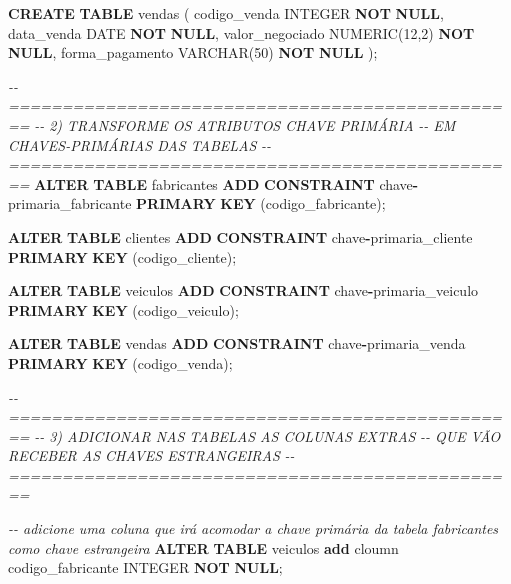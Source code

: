 \documentclass[
]{book}
\newenvironment{Shaded}{\begin{snugshade}}{\end{snugshade}}
\newcommand{\CommentTok}[1]{\textcolor[rgb]{0.56,0.35,0.01}{\textit{#1}}}
\newcommand{\DataTypeTok}[1]{\textcolor[rgb]{0.13,0.29,0.53}{#1}}
\newcommand{\DecValTok}[1]{\textcolor[rgb]{0.00,0.00,0.81}{#1}}
\newcommand{\KeywordTok}[1]{\textcolor[rgb]{0.13,0.29,0.53}{\textbf{#1}}}
\newcommand{\NormalTok}[1]{#1}
\newcommand{\OperatorTok}[1]{\textcolor[rgb]{0.81,0.36,0.00}{\textbf{#1}}}
\begin{document}
\begin{Shaded}
\begin{Highlighting}[]
\KeywordTok{CREATE} \KeywordTok{TABLE}\NormalTok{ vendas}
\NormalTok{(}
\NormalTok{    codigo\_venda     }\DataTypeTok{INTEGER}          \KeywordTok{NOT} \KeywordTok{NULL}\NormalTok{,}
\NormalTok{    data\_venda       }\DataTypeTok{DATE}             \KeywordTok{NOT} \KeywordTok{NULL}\NormalTok{,}
\NormalTok{    valor\_negociado  }\DataTypeTok{NUMERIC}\NormalTok{(}\DecValTok{12}\NormalTok{,}\DecValTok{2}\NormalTok{)    }\KeywordTok{NOT} \KeywordTok{NULL}\NormalTok{,}
\NormalTok{    forma\_pagamento  }\DataTypeTok{VARCHAR}\NormalTok{(}\DecValTok{50}\NormalTok{)      }\KeywordTok{NOT} \KeywordTok{NULL}
\NormalTok{);}

\CommentTok{{-}{-} ================================================}
\CommentTok{{-}{-} 2) TRANSFORME OS ATRIBUTOS CHAVE PRIMÁRIA}
\CommentTok{{-}{-} EM CHAVES{-}PRIMÁRIAS DAS TABELAS}
\CommentTok{{-}{-} ================================================}
\KeywordTok{ALTER} \KeywordTok{TABLE}\NormalTok{ fabricantes }\KeywordTok{ADD} \KeywordTok{CONSTRAINT}\NormalTok{ chave}\OperatorTok{{-}}\NormalTok{primaria\_fabricante }\KeywordTok{PRIMARY} \KeywordTok{KEY}\NormalTok{ (codigo\_fabricante);}

\KeywordTok{ALTER} \KeywordTok{TABLE}\NormalTok{ clientes    }\KeywordTok{ADD} \KeywordTok{CONSTRAINT}\NormalTok{ chave}\OperatorTok{{-}}\NormalTok{primaria\_cliente }\KeywordTok{PRIMARY} \KeywordTok{KEY}\NormalTok{ (codigo\_cliente);}

\KeywordTok{ALTER} \KeywordTok{TABLE}\NormalTok{ veiculos    }\KeywordTok{ADD} \KeywordTok{CONSTRAINT}\NormalTok{ chave}\OperatorTok{{-}}\NormalTok{primaria\_veiculo }\KeywordTok{PRIMARY} \KeywordTok{KEY}\NormalTok{ (codigo\_veiculo);}

\KeywordTok{ALTER} \KeywordTok{TABLE}\NormalTok{ vendas      }\KeywordTok{ADD} \KeywordTok{CONSTRAINT}\NormalTok{ chave}\OperatorTok{{-}}\NormalTok{primaria\_venda }\KeywordTok{PRIMARY} \KeywordTok{KEY}\NormalTok{ (codigo\_venda);}

\CommentTok{{-}{-} ================================================}
\CommentTok{{-}{-} 3) ADICIONAR NAS TABELAS AS COLUNAS EXTRAS}
\CommentTok{{-}{-}    QUE VÃO RECEBER AS CHAVES ESTRANGEIRAS}
\CommentTok{{-}{-} ================================================}

\CommentTok{{-}{-} adicione uma coluna que irá acomodar a chave primária da tabela fabricantes como chave estrangeira}
\KeywordTok{ALTER} \KeywordTok{TABLE}\NormalTok{ veiculos }\KeywordTok{add}\NormalTok{ cloumn  codigo\_fabricante   }\DataTypeTok{INTEGER} \KeywordTok{NOT} \KeywordTok{NULL}\NormalTok{;}


\end{Highlighting}
\end{Shaded}
\end{document}
